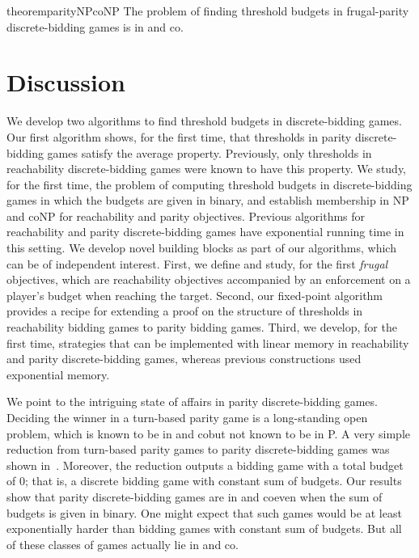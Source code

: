 \documentclass{theoretics}
\begin{document}
\begin{restatable}{theorem}{parityNPcoNP}
	\label{thm:parity-NP-coNP}
	The problem of finding threshold budgets in frugal-parity discrete-bidding games is in \NP and co\NP. 
\end{restatable}

\section{Discussion}
We develop two algorithms to find threshold budgets in discrete-bidding games. Our first algorithm shows, for the first time, that thresholds in parity discrete-bidding games satisfy the average property. Previously, only thresholds in reachability discrete-bidding games were known to have this property. 
We study, for the first time, the problem of computing threshold budgets in discrete-bidding games in which the budgets are given in binary, and establish membership in NP and coNP for reachability and parity objectives. 
Previous algorithms for reachability and parity discrete-bidding games have exponential running time in this setting. 
We develop novel building blocks as part of our algorithms, which can be of independent interest. First, we define and study, for the first {\em frugal} objectives, which are reachability objectives accompanied by an enforcement on a player's budget when reaching the target. Second, our fixed-point algorithm provides a recipe for extending a proof on the structure of thresholds in reachability bidding games to parity bidding games. Third, we develop, for the first time, strategies that can be implemented with linear memory in reachability and parity discrete-bidding games, whereas previous constructions used exponential memory. 


We point to the intriguing state of affairs in parity discrete-bidding games. 
Deciding the winner in a turn-based parity game is a long-standing open problem, which is known to be in \NP and co\NP but not known to be in P. 
A very simple reduction from turn-based parity games to parity discrete-bidding games was shown in~\cite{AAH21}. Moreover, the reduction outputs a bidding game with a total budget of $0$; that is, a discrete bidding game with constant sum of budgets.
Our results show that parity discrete-bidding games are in \NP and co\NP even when the sum of budgets is given in binary. One might expect that such games would be at least exponentially harder than bidding games with constant sum of budgets. But all of these classes of games actually lie in \NP and co\NP. 



\printbibliography
\end{document}
